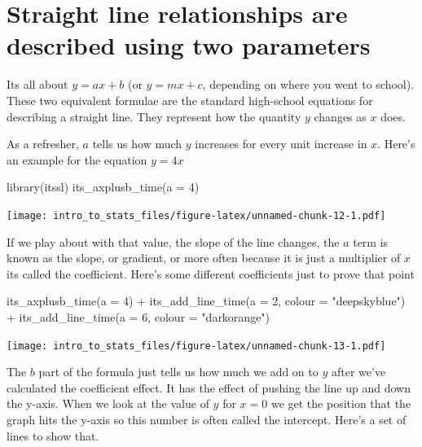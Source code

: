 \documentclass[
]{book}
\newenvironment{Shaded}{\begin{snugshade}}{\end{snugshade}}
\newcommand{\AttributeTok}[1]{\textcolor[rgb]{0.77,0.63,0.00}{#1}}
\newcommand{\DecValTok}[1]{\textcolor[rgb]{0.00,0.00,0.81}{#1}}
\newcommand{\FunctionTok}[1]{\textcolor[rgb]{0.00,0.00,0.00}{#1}}
\newcommand{\NormalTok}[1]{#1}
\newcommand{\SpecialCharTok}[1]{\textcolor[rgb]{0.00,0.00,0.00}{#1}}
\newcommand{\StringTok}[1]{\textcolor[rgb]{0.31,0.60,0.02}{#1}}
\begin{document}
\hypertarget{straight-line-relationships-are-described-using-two-parameters}{%
\section{Straight line relationships are described using two parameters}\label{straight-line-relationships-are-described-using-two-parameters}}

Its all about \(y = ax + b\) (or \(y = mx + c\), depending on where you went to school). These two equivalent formulae are the standard high-school equations for describing a straight line. They represent how the quantity \(y\) changes as \(x\) does.

As a refresher, \(a\) tells us how much \(y\) increases for every unit increase in \(x\). Here's an example for the equation \(y = 4x\)

\begin{Shaded}
\begin{Highlighting}[]
\FunctionTok{library}\NormalTok{(itssl)}
\FunctionTok{its\_axplusb\_time}\NormalTok{(}\AttributeTok{a =} \DecValTok{4}\NormalTok{)}
\end{Highlighting}
\end{Shaded}

\texttt{[image: intro\_to\_stats\_files/figure-latex/unnamed-chunk-12-1.pdf]}

If we play about with that value, the slope of the line changes, the \(a\) term is known as the slope, or gradient, or more often because it is just a multiplier of \(x\) its called the coefficient. Here's some different coefficients just to prove that point

\begin{Shaded}
\begin{Highlighting}[]
\FunctionTok{its\_axplusb\_time}\NormalTok{(}\AttributeTok{a =} \DecValTok{4}\NormalTok{) }\SpecialCharTok{+}
  \FunctionTok{its\_add\_line\_time}\NormalTok{(}\AttributeTok{a =} \DecValTok{2}\NormalTok{, }\AttributeTok{colour =} \StringTok{"deepskyblue"}\NormalTok{) }\SpecialCharTok{+}
  \FunctionTok{its\_add\_line\_time}\NormalTok{(}\AttributeTok{a =} \DecValTok{6}\NormalTok{, }\AttributeTok{colour =} \StringTok{"darkorange"}\NormalTok{)}
\end{Highlighting}
\end{Shaded}

\texttt{[image: intro\_to\_stats\_files/figure-latex/unnamed-chunk-13-1.pdf]}

The \(b\) part of the formula just tells us how much we add on to \(y\) after we've calculated the coefficient effect. It has the effect of pushing the line up and down the y-axis. When we look at the value of \(y\) for \(x = 0\) we get the position that the graph hits the y-axis so this number is often called the intercept. Here's a set of lines to show that.
\end{document}
